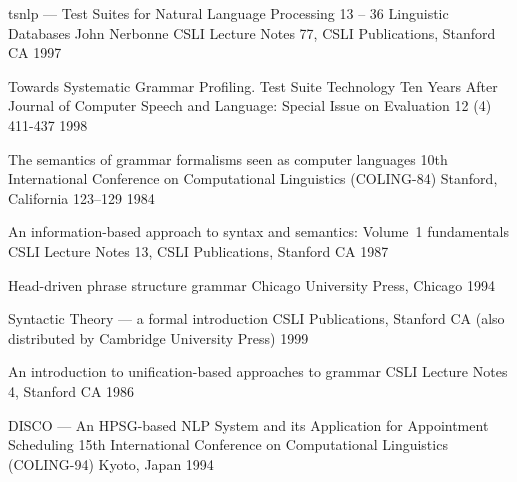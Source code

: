 \documentclass[12pt]{report}
\begin{document}
\begin{list}{}
{{\sc tsnlp} --- {T}est {S}uites for {N}atural {L}anguage {P}rocessing}
{13 -- 36}
{Linguistic Databases}
{John Nerbonne}
{CSLI Lecture Notes 77, CSLI Publications, Stanford CA}
{1997}

{Towards Systematic Grammar Profiling.
               {T}est Suite Technology Ten Years After}
{Journal of Computer Speech and Language:
Special Issue on Evaluation}
{12 (4)}
{411-437}
{1998}

{The semantics of grammar formalisms seen as computer languages}
{10th International Conference on Computational Linguistics
(COLING-84)}
{Stanford, California}
{123--129}
{1984}

 {An information-based approach to syntax and semantics: 
Volume~1 fundamentals} 
 {CSLI Lecture Notes 13, CSLI Publications, Stanford CA}
 {1987}

    {Head-driven phrase structure grammar}
    {Chicago University Press, Chicago}
    {1994}

     {Syntactic Theory --- a formal introduction}
     {CSLI Publications, Stanford CA (also distributed by 
Cambridge University Press)}
     {1999}
    
{An introduction to unification-based approaches to grammar}
{CSLI Lecture Notes 4, Stanford CA}
{1986}

{{DISCO} --- An {HPSG}-based {NLP} System and its Application for 
Appointment Scheduling}
{15th International Conference on Computational
Linguistics (COLING-94)}
{Kyoto, Japan}
{1994}

\end{list}
\end{document}
